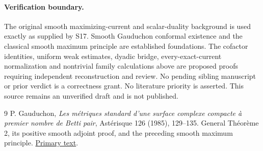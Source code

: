 \documentclass[11pt]{article}
\theoremstyle{remark}\newtheorem{remark}[theorem]{Remark}
\begin{document}
\paragraph{Verification boundary.}
The original smooth maximizing-current and scalar-duality background
is used exactly as supplied by S17. Smooth Gauduchon conformal
existence and the classical smooth maximum principle are established
foundations. The cofactor identities, uniform weak estimates,
dyadic bridge, every-exact-current normalization and nontrivial
family calculations above are proposed proofs requiring independent
reconstruction and review. No pending sibling manuscript or prior
verdict is a correctness grant. No literature priority is asserted.
This source remains an unverified draft and is not published.

\begin{thebibliography}{9}
 P. Gauduchon,
\emph{Les m\'etriques standard d'une surface complexe compacte
\`a premier nombre de Betti pair}, Ast\'erisque 126 (1985), 129--135.
General Th\'eor\`eme 2, its positive smooth adjoint proof,
and the preceding smooth maximum principle.
\href{https://www.numdam.org/article/AST_1985__126__129_0.pdf}{Primary text}.
\end{thebibliography}
\end{document}
